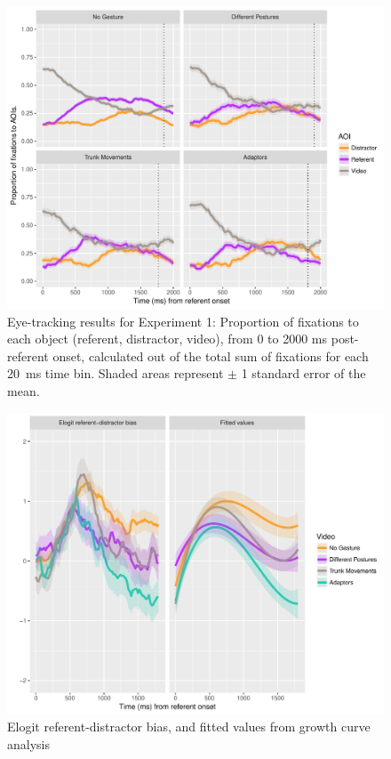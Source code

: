 \documentclass[a4paper,man,natbib]{apa6}
\begin{document}
\begin{figure}[Ht]
  \centering
	\includegraphics[width=\linewidth]{./img/e7_fixations.pdf}
  \caption{Eye-tracking results for Experiment 1: Proportion of fixations to each object (referent, distractor, video), from 0 to 2000 ms post-referent onset, calculated out of the total sum of fixations for each 20~ms time bin. Shaded areas represent $\pm$ 1 standard error of the mean.}
  \label{fig:v1_eye}
\end{figure}

\begin{figure}[Ht]
  \centering
	\includegraphics[width=\linewidth]{./img/e7_gcamodel.pdf}
  \caption{Elogit referent-distractor bias, and fitted values from growth curve analysis}
  \label{fig:v1_gca}
\end{figure}
\end{document}
